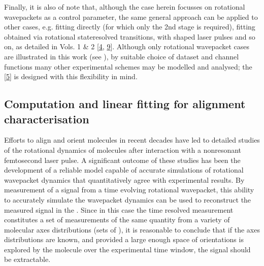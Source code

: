 \documentclass[letterpaper,table,10pt,english]{jupyterBook}
\begin{document}
\sphinxAtStartPar
Finally, it is also of note that, although the case herein focusses on rotational wavepackets as a control parameter, the same general approach can be applied to other cases, e.g. fitting {\hyperref[\detokenize{backmatter/glossary:term-MF}]{}} directly (for which only the 2nd stage is required), fitting {\hyperref[\detokenize{backmatter/glossary:term-PADs}]{}} obtained via rotational state\sphinxhyphen{}resolved transitions, with shaped laser pulses and so on, as detailed in  Vols. 1 \& 2 {[}\hyperlink{cite.backmatter/bibliography:id676}{4}, \hyperlink{cite.backmatter/bibliography:id677}{9}{]}. Although only rotational wavepacket cases are illustrated in this work (see {\hyperref[\detokenize{part2/extracting_matrix_elements_overview_270423:chpt-extracting-matrix-elements-overview}]{}}), by suitable choice of dataset and channel functions many other experimental schemes may be modelled and analysed; the  {[}\hyperlink{cite.backmatter/bibliography:id681}{5}{]} is designed with  this flexibility in mind.


\subsection{Computation and linear fitting for alignment characterisation}
\label{\detokenize{part1/numerics_070723:computation-and-linear-fitting-for-alignment-characterisation}}\label{\detokenize{part1/numerics_070723:sect-numerics-alignment-retrieval}}
\sphinxAtStartPar
Efforts to align and orient molecules in recent decades have led to detailed studies of the rotational dynamics of molecules after interaction with a non\sphinxhyphen{}resonant femtosecond laser pulse. A significant outcome of these studies has been the development of a reliable model capable of accurate simulations of rotational wavepacket dynamics that quantitatively agree with experimental results. By measurement of a signal from a time evolving rotational wavepacket, this ability to accurately simulate the wavepacket dynamics can be used to reconstruct the measured signal in the {\hyperref[\detokenize{backmatter/glossary:term-MF}]{}}. Since in this case the time resolved measurement constitutes a set of measurements of the same quantity from a variety of molecular axes distributions (sets of {\hyperref[\detokenize{backmatter/glossary:term-ADMs}]{}}), it is reasonable to conclude that if the axes distributions are known, and provided a large enough space of orientations is explored by the molecule over the experimental time window, the {\hyperref[\detokenize{backmatter/glossary:term-MF}]{}} signal should be extractable.
\end{document}

